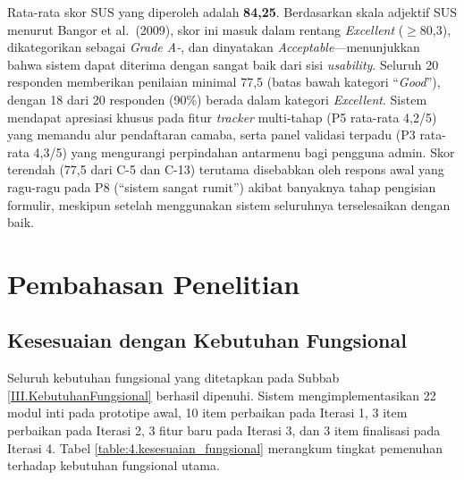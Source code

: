Rata-rata skor SUS yang diperoleh adalah \textbf{84{,}25}. Berdasarkan skala adjektif SUS menurut Bangor et al.\ (2009), skor ini masuk dalam rentang \textit{Excellent} ($\geq$80{,}3), dikategorikan sebagai \textit{Grade A-}, dan dinyatakan \textit{Acceptable}---menunjukkan bahwa sistem dapat diterima dengan sangat baik dari sisi \textit{usability}. Seluruh 20 responden memberikan penilaian minimal 77{,}5 (batas bawah kategori ``\textit{Good}''), dengan 18 dari 20 responden (90\%) berada dalam kategori \textit{Excellent}. Sistem mendapat apresiasi khusus pada fitur \textit{tracker} multi-tahap (P5 rata-rata 4{,}2/5) yang memandu alur pendaftaran camaba, serta panel validasi terpadu (P3 rata-rata 4{,}3/5) yang mengurangi perpindahan antarmenu bagi pengguna admin. Skor terendah (77{,}5 dari C-5 dan C-13) terutama disebabkan oleh respons awal yang ragu-ragu pada P8 (``sistem sangat rumit'') akibat banyaknya tahap pengisian formulir, meskipun setelah menggunakan sistem seluruhnya terselesaikan dengan baik.\par

\section{Pembahasan Penelitian} \label{IV.Pembahasan}

\subsection{Kesesuaian dengan Kebutuhan Fungsional} \label{IV.AnalisisFungsional}

Seluruh kebutuhan fungsional yang ditetapkan pada Subbab \ref{III.KebutuhanFungsional} berhasil dipenuhi. Sistem mengimplementasikan 22 modul inti pada prototipe awal, 10 item perbaikan pada Iterasi 1, 3 item perbaikan pada Iterasi 2, 3 fitur baru pada Iterasi 3, dan 3 item finalisasi pada Iterasi 4. Tabel \ref{table:4.kesesuaian_fungsional} merangkum tingkat pemenuhan terhadap kebutuhan fungsional utama.\par

